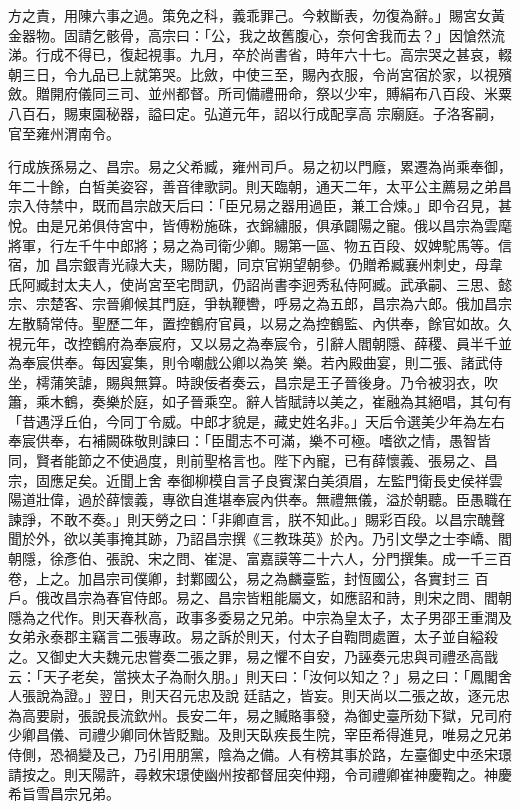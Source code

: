 \begin{pinyinscope}
 方之責，用陳六事之過。策免之科，義乖罪己。今敕斷表，勿復為辭。」賜宮女黃金器物。固請乞骸骨，高宗曰：「公，我之故舊腹心，奈何舍我而去？」因愴然流涕。行成不得已，復起視事。九月，卒於尚書省，時年六十七。高宗哭之甚哀，輟朝三日，令九品已上就第哭。比斂，中使三至，賜內衣服，令尚宮宿於家，以視殯斂。贈開府儀同三司、並州都督。所司備禮冊命，祭以少牢，賻絹布八百段、米粟八百石，賜東園秘器，謚曰定。弘道元年，詔以行成配享高
 宗廟庭。子洛客嗣，官至雍州渭南令。



 行成族孫易之、昌宗。易之父希臧，雍州司戶。易之初以門廕，累遷為尚乘奉御，年二十餘，白皙美姿容，善音律歌詞。則天臨朝，通天二年，太平公主薦易之弟昌宗入侍禁中，既而昌宗啟天后曰：「臣兄易之器用過臣，兼工合煉。」即令召見，甚悅。由是兄弟俱侍宮中，皆傅粉施硃，衣錦繡服，俱承闢陽之寵。俄以昌宗為雲麾將軍，行左千牛中郎將；易之為司衛少卿。賜第一區、物五百段、奴婢駝馬等。信宿，加
 昌宗銀青光祿大夫，賜防閣，同京官朔望朝參。仍贈希臧襄州刺史，母韋氏阿臧封太夫人，使尚宮至宅問訊，仍詔尚書李迥秀私侍阿臧。武承嗣、三思、懿宗、宗楚客、宗晉卿候其門庭，爭執鞭轡，呼易之為五郎，昌宗為六郎。俄加昌宗左散騎常侍。聖歷二年，置控鶴府官員，以易之為控鶴監、內供奉，餘官如故。久視元年，改控鶴府為奉宸府，又以易之為奉宸令，引辭人閻朝隱、薛稷、員半千並為奉宸供奉。每因宴集，則令嘲戲公卿以為笑
 樂。若內殿曲宴，則二張、諸武侍坐，樗蒲笑謔，賜與無算。時諛佞者奏云，昌宗是王子晉後身。乃令被羽衣，吹簫，乘木鶴，奏樂於庭，如子晉乘空。辭人皆賦詩以美之，崔融為其絕唱，其句有「昔遇浮丘伯，今同丁令威。中郎才貌是，藏史姓名非。」天后令選美少年為左右奉宸供奉，右補闕硃敬則諫曰：「臣聞志不可滿，樂不可極。嗜欲之情，愚智皆同，賢者能節之不使過度，則前聖格言也。陛下內寵，已有薛懷義、張易之、昌宗，固應足矣。近聞上舍
 奉御柳模自言子良賓潔白美須眉，左監門衛長史侯祥雲陽道壯偉，過於薛懷義，專欲自進堪奉宸內供奉。無禮無儀，溢於朝聽。臣愚職在諫諍，不敢不奏。」則天勞之曰：「非卿直言，朕不知此。」賜彩百段。以昌宗醜聲聞於外，欲以美事掩其跡，乃詔昌宗撰《三教珠英》於內。乃引文學之士李嶠、閻朝隱，徐彥伯、張說、宋之問、崔湜、富嘉謨等二十六人，分門撰集。成一千三百卷，上之。加昌宗司僕卿，封鄴國公，易之為麟臺監，封恆國公，各實封三
 百戶。俄改昌宗為春官侍郎。易之、昌宗皆粗能屬文，如應詔和詩，則宋之問、閻朝隱為之代作。則天春秋高，政事多委易之兄弟。中宗為皇太子，太子男邵王重潤及女弟永泰郡主竊言二張專政。易之訴於則天，付太子自鞫問處置，太子並自縊殺之。又御史大夫魏元忠嘗奏二張之罪，易之懼不自安，乃誣奏元忠與司禮丞高戩云：「天子老矣，當挾太子為耐久朋。」則天曰：「汝何以知之？」易之曰：「鳳閣舍人張說為證。」翌日，則天召元忠及說
 廷詰之，皆妄。則天尚以二張之故，逐元忠為高要尉，張說長流欽州。長安二年，易之贓賂事發，為御史臺所劾下獄，兄司府少卿昌儀、司禮少卿同休皆貶黜。及則天臥疾長生院，宰臣希得進見，唯易之兄弟侍側，恐禍變及己，乃引用朋黨，陰為之備。人有榜其事於路，左臺御史中丞宋璟請按之。則天陽許，尋敕宋璟使幽州按都督屈突仲翔，令司禮卿崔神慶鞫之。神慶希旨雪昌宗兄弟。




\end{pinyinscope}
